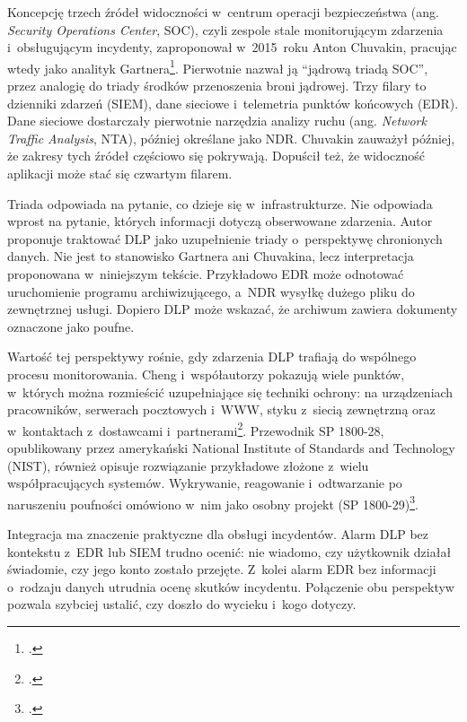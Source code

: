 \documentclass[12pt,a4paper]{article}
\begin{document}
Koncepcję trzech źródeł widoczności w~centrum operacji bezpieczeństwa (ang.
\emph{Security Operations Center}, SOC), czyli zespole stale monitorującym
zdarzenia i~obsługującym incydenty, zaproponował w~2015~roku Anton Chuvakin, pracując wtedy jako analityk
Gartnera\footcite{chuvakin2020triad}. Pierwotnie nazwał ją \enquote{jądrową
triadą SOC}, przez analogię do triady środków przenoszenia broni jądrowej.
Trzy filary to dzienniki zdarzeń (SIEM), dane sieciowe i~telemetria punktów
końcowych (EDR). Dane sieciowe dostarczały pierwotnie narzędzia analizy ruchu
(ang. \emph{Network Traffic Analysis}, NTA), później określane jako NDR. Chuvakin zauważył później, że zakresy
tych źródeł częściowo się pokrywają. Dopuścił też, że widoczność aplikacji
może stać się czwartym filarem.

Triada odpowiada na pytanie, co dzieje się w~infrastrukturze. Nie odpowiada
wprost na pytanie, których informacji dotyczą obserwowane zdarzenia. Autor
proponuje traktować DLP jako uzupełnienie triady o~perspektywę chronionych
danych. Nie jest to stanowisko Gartnera ani Chuvakina, lecz interpretacja
proponowana w~niniejszym tekście. Przykładowo EDR może odnotować uruchomienie programu
archiwizującego, a~NDR wysyłkę dużego pliku do zewnętrznej usługi. Dopiero
DLP może wskazać, że archiwum zawiera dokumenty oznaczone jako poufne.

Wartość tej perspektywy rośnie, gdy zdarzenia DLP trafiają do wspólnego
procesu monitorowania. Cheng i~współautorzy pokazują wiele punktów, w~których
można rozmieścić uzupełniające się techniki ochrony: na urządzeniach
pracowników, serwerach pocztowych i~WWW, styku z~siecią zewnętrzną oraz
w~kontaktach z~dostawcami i~partnerami\footcite{cheng2017enterprise}.
Przewodnik SP 1800-28, opublikowany przez amerykański National Institute of
Standards and Technology (NIST), również opisuje rozwiązanie przykładowe złożone
z~wielu współpracujących systemów. Wykrywanie, reagowanie i~odtwarzanie po
naruszeniu poufności omówiono w~nim jako osobny projekt (SP
1800-29)\footcite{nist2024dataconf}.

Integracja ma znaczenie praktyczne dla obsługi incydentów. Alarm DLP bez
kontekstu z~EDR lub SIEM trudno ocenić: nie wiadomo, czy użytkownik działał
świadomie, czy jego konto zostało przejęte. Z~kolei alarm EDR bez informacji
o~rodzaju danych utrudnia ocenę skutków incydentu. Połączenie obu perspektyw
pozwala szybciej ustalić, czy doszło do wycieku i~kogo dotyczy.

\end{document}
